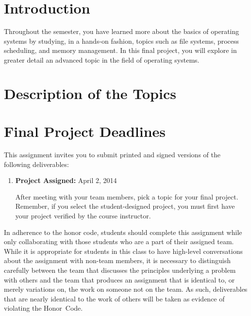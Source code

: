 


\usepackage[compact]{titlesec}



\section*{Introduction}

Throughout the semester, you have learned more about the basics of operating systems by studying, in a hands-on fashion,
topics such as file systems, process scheduling, and memory management.  In this final project, you will explore in
greater detail an advanced topic in the field of operating systems.

\section*{Description of the Topics}



\section*{Final Project Deadlines}

This assignment invites you to submit printed and signed versions of the following deliverables: 

\vspace*{-.05in}
\begin{enumerate}

  \itemsep0in

  \item {\bf Project Assigned:} April 2, 2014

    After meeting with your team members, pick a topic for your final project.  Remember, if you select the
    student-designed project, you must first have your project verified by the course instructor.


\end{enumerate}
\vspace*{-.05in}

In adherence to the honor code, students should complete this assignment while only collaborating with those students
who are a part of their assigned team. While it is appropriate for students in this class to have high-level
conversations about the assignment with non-team members, it is necessary to distinguish carefully between the team that
discusses the principles underlying a problem with others and the team that produces an assignment that is identical to,
or merely variations on, the work on someone not on the team.  As such, deliverables that are nearly identical to the
work of others will be taken as evidence of violating the \mbox{Honor Code}.  

  
